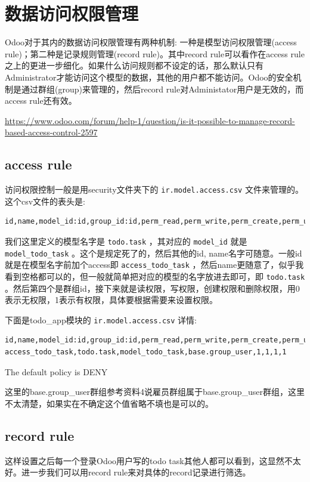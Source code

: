 \documentclass[11pt,a4paper]{sphinxmanual}
\begin{document}
\section{数据访问权限管理}
\label{sec-7-1}
Odoo对于其内的数据访问权限管理有两种机制: 一种是模型访问权限管理(access rule)；第二种是记录规则管理(record rule)。其中record rule可以看作在access rule之上的更进一步细化。如果什么访问规则都不设定的话，那么默认只有Administrator才能访问这个模型的数据，其他的用户都不能访问。Odoo的安全机制是通过群组(group)来管理的，然后record rule对Administator用户是无效的，而access rule还有效。


\url{https://www.odoo.com/forum/help-1/question/is-it-possible-to-manage-record-based-access-control-2597}

\subsection{access rule}
\label{sec-7-1-1}
访问权限控制一般是用security文件夹下的 \verb~ir.model.access.csv~ 文件来管理的。这个csv文件的表头是:

\begin{Verbatim}
id,name,model_id:id,group_id:id,perm_read,perm_write,perm_create,perm_unlink
\end{Verbatim}

我们这里定义的模型名字是 \verb~todo.task~ ，其对应的 \verb~model_id~ 就是 \verb~model_todo_task~ 。这个是规定死了的，然后其他的id, name名字可随意。一般id就是在模型名字前加个access即 \verb~access_todo_task~ ，然后name更随意了，似乎我看到空格都可以的，但一般就简单把对应的模型的名字放进去即可，即 \verb~todo.task~ 。然后第四个是群组id，接下来就是读权限，写权限，创建权限和删除权限，用0表示无权限，1表示有权限，具体要根据需要来设置权限。


下面是todo\_app模块的 \verb~ir.model.access.csv~ 详情:
\begin{Verbatim}
id,name,model_id:id,group_id:id,perm_read,perm_write,perm_create,perm_unlink
access_todo_task,todo.task,model_todo_task,base.group_user,1,1,1,1
\end{Verbatim}


The default policy is DENY


这里的base.group\_user群组参考资料4说雇员群组属于base.group\_user群组，这里不太清楚，如果实在不确定这个值省略不填也是可以的。


\subsection{record rule}
\label{sec-7-1-2}
这样设置之后每一个登录Odoo用户写的todo task其他人都可以看到，这显然不太好。进一步我们可以用record rule来对具体的record记录进行筛选。
\end{document}
